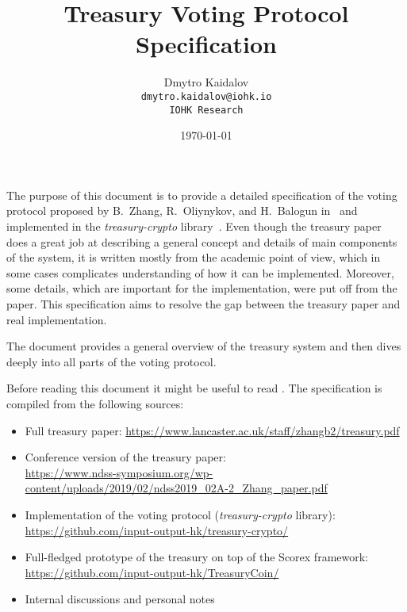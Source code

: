\documentclass{article}
\title{Treasury Voting Protocol Specification}
\author{Dmytro Kaidalov\\
    \texttt{dmytro.kaidalov@iohk.io}\\
    \texttt{IOHK Research}}
\date{\today}
\begin{document}
\maketitle
\thispagestyle{empty}

The purpose of this document is to provide a detailed specification of the voting protocol proposed by B.~Zhang, R.~Oliynykov, and H.~Balogun in~\cite{ZOB18} and implemented in the \textit{treasury-crypto} library~\cite{treasury-crypto}. Even though the treasury paper~\cite{ZOB18} does a great job at describing a general concept and details of main components of the system, it is written mostly from the academic point of view, which in some cases complicates understanding of how it can be implemented. Moreover, some details, which are important for the implementation, were put off from the paper. This specification aims to resolve the gap between the treasury paper and real implementation.

The document provides a general overview of the treasury system and then dives deeply into all parts of the voting protocol.

Before reading this document it might be useful to read \cite{ZOB18}. 
The specification is compiled from the following sources:
\begin{itemize}
    \item Full treasury paper: \url{https://www.lancaster.ac.uk/staff/zhangb2/treasury.pdf} \cite{ZOB18}
    \item Conference version of the treasury paper:\\ \url{https://www.ndss-symposium.org/wp-content/uploads/2019/02/ndss2019_02A-2_Zhang_paper.pdf} \cite{ZOB18NDSS}
    \item Implementation of the voting protocol (\textit{treasury-crypto} library):\\ \url{https://github.com/input-output-hk/treasury-crypto/} \cite{treasury-crypto}
    \item Full-fledged prototype of the treasury on top of the Scorex framework:\\
    \url{https://github.com/input-output-hk/TreasuryCoin/} \cite{treasurycoin}
    \item Internal discussions and personal notes
\end{itemize}

\newpage
{
  \hypersetup{linkcolor=black}
  \tableofcontents
}





\end{document}
